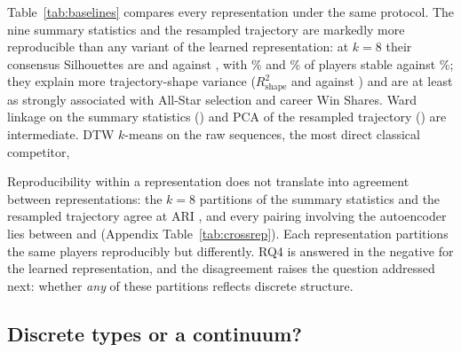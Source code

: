 Table~\ref{tab:baselines} compares every representation under the same protocol. The nine summary statistics and the resampled trajectory are markedly more reproducible than any variant of the learned representation: at $k=8$ their consensus Silhouettes are \summSilEight{} and \rawSilEight{} against \aeAllSilEight, with \summStableEight\% and \rawStableEight\% of players stable against \aeAllStableEight\%; they explain more trajectory-shape variance ($R^2_{\mathrm{shape}}$ \summRsqEight{} and \rawRsqEight{} against \aeAllRsqEight) and are at least as strongly associated with All-Star selection and career Win Shares. Ward linkage on the summary statistics (\summWardSilEight) and PCA of the resampled trajectory (\pcaSilEight) are intermediate. DTW $k$-means on the raw sequences, the most direct classical competitor, \dtwSentence

Reproducibility within a representation does not translate into agreement between representations: the $k=8$ partitions of the summary statistics and the resampled trajectory agree at ARI \xSummaryRaw, and every pairing involving the autoencoder lies between \xMin{} and \xMax{} (Appendix Table~\ref{tab:crossrep}). Each representation partitions the same players reproducibly but differently. RQ4 is answered in the negative for the learned representation, and the disagreement raises the question addressed next: whether \emph{any} of these partitions reflects discrete structure.

\begin{table}[t]\centering\scriptsize
\caption{All representations under the same consensus protocol. Sil.$_C$ = consensus Silhouette; PAC = proportion of ambiguous pairs; Stable \% = share of players with stability $\ge 0.5$; $R^2_{\mathrm{shape}}$ = share of resampled-trajectory variance explained by cluster membership; $V_{\mathrm{AS}}$ = Cram\'er's $V$ with All-Star selection; $\varepsilon^2_{\mathrm{WS}}$ = Kruskal--Wallis effect size for career Win Shares. Left block: $k$ selected by the rule; right block: all representations at $k=8$.}
\label{tab:baselines}
\resizebox{\textwidth}{!}{}
\end{table}

\subsection{Discrete types or a continuum?}\label{sec:res_structure}

